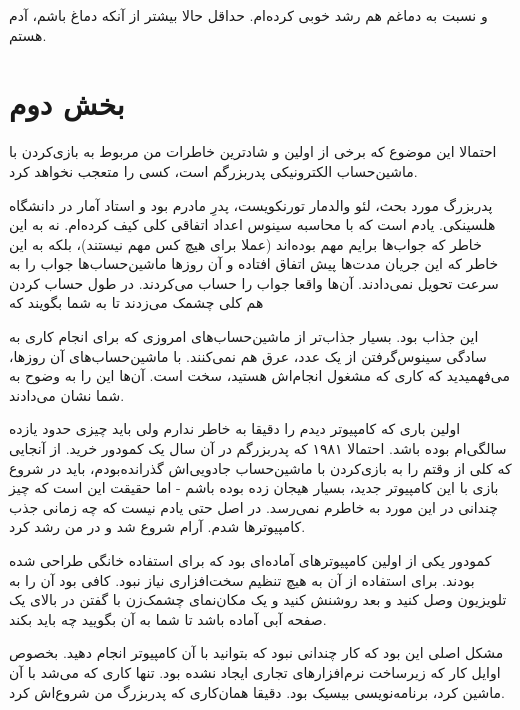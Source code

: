 و نسبت به دماغم هم رشد خوبی کرده‌ام. حداقل حالا بیشتر از آنکه دماغ
باشم، آدم هستم.

\section{بخش دوم}
احتمالا این موضوع که برخی از اولین و شادترین خاطرات من مربوط به
بازی‌کردن با ماشین‌حساب الکترونیکی پدربزرگم است، کسی را متعجب نخواهد
کرد.

پدربزرگ مورد بحث، لئو والدمار تورنکویست، پدرِ مادرم بود و استاد آمار در دانشگاه هلسینکی. یادم است
که با محاسبه سینوس اعداد اتفاقی کلی کیف کرده‌ام. نه به این خاطر که
جواب‌ها برایم مهم بوده‌اند (عملا برای هیچ کس مهم نیستند)، بلکه به این
خاطر که این جریان مدت‌ها پیش اتفاق افتاده و آن روزها ماشین‌حساب‌ها جواب
را به سرعت تحویل نمی‌دادند. آن‌ها واقعا جواب را حساب می‌کردند. در طول
حساب کردن هم کلی چشمک می‌زدند تا به شما بگویند که 

این جذاب بود. بسیار جذاب‌تر از ماشین‌حساب‌های امروزی که برای انجام کاری
به سادگی سینوس‌گرفتن از یک عدد، عرق هم نمی‌کنند. با ماشین‌حساب‌های آن
روزها، می‌فهمیدید که کاری که مشغول انجام‌اش هستید، سخت است. آن‌ها این را
به وضوح به شما نشان می‌دادند.

اولین باری که کامپیوتر دیدم را دقیقا به خاطر ندارم ولی باید چیزی حدود
یازده‌ سالگی‌ام بوده باشد. احتمالا ۱۹۸۱ که پدربزرگم در آن سال یک کمودور
 خرید. از آنجایی که کلی از وقتم را به بازی‌کردن با
ماشین‌حساب جادویی‌اش گذرانده‌بودم، باید در شروع بازی با این کامپیوتر
جدید، بسیار هیجان زده بوده باشم - اما حقیقت این است که چیز چندانی در
این مورد به خاطرم نمی‌رسد. در اصل حتی یادم نیست که چه زمانی جذب
کامپیوترها شدم. آرام شروع شد و در من رشد کرد.

کمودور  یکی از اولین کامپیوترهای آماده‌ای بود که برای
استفاده خانگی طراحی شده بودند. برای استفاده از آن به هیچ تنظیم
سخت‌افزاری نیاز نبود. کافی بود آن را به تلویزیون وصل کنید و بعد روشنش
کنید و یک مکان‌نمای چشمک‌زن با گفتن  در بالای یک صفحه آبی
آماده باشد تا شما به آن بگویید چه باید بکند.

مشکل اصلی این بود که کار چندانی نبود که بتوانید با آن کامپیوتر انجام
دهید. بخصوص اوایل کار که زیرساخت نرم‌افزارهای تجاری ایجاد نشده
بود. تنها کاری که می‌شد با آن ماشین کرد، برنامه‌نویسی بیسیک بود. دقیقا همان‌کاری که
پدربزرگ من شروع‌اش کرد.

